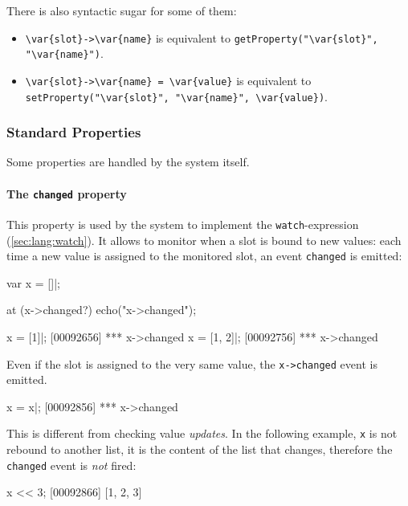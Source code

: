 There is also syntactic sugar for some of them:

\begin{itemize}
\item \lstinline|\var{slot}->\var{name}| is equivalent to
  \lstinline[style=varInString]|getProperty("\var{slot}", "\var{name}")|.
\item \lstinline|\var{slot}->\var{name} = \var{value}| is equivalent to
  \lstinline[style=varInString]|setProperty("\var{slot}", "\var{name}", \var{value})|.
\end{itemize}

\subsubsection{Standard Properties}
\label{sec:lang:prop:std}

Some properties are handled by the system itself.


\paragraph{The \lstinline|changed| property}

This property is used by the system to implement the
\lstinline|watch|-expression (\autoref{sec:lang:watch}).  It allows to
monitor when a slot is bound to new values: each time a new value is
assigned to the monitored slot, an event \lstinline|changed| is emitted:

\begin{urbiscript}[firstnumber=1]
var x = []|;

at (x->changed?)
  echo("x->changed");

x = [1]|;
[00092656] *** x->changed
x = [1, 2]|;
[00092756] *** x->changed
\end{urbiscript}

Even if the slot is assigned to the very same value, the
\lstinline|x->changed| event is emitted.

\begin{urbiscript}
x = x|;
[00092856] *** x->changed
\end{urbiscript}

This is different from checking value \emph{updates}.  In the following
example, \lstinline|x| is not rebound to another list, it is the content of
the list that changes, therefore the \lstinline|changed| event is \emph{not}
fired:

\begin{urbiscript}
x << 3;
[00092866] [1, 2, 3]
\end{urbiscript}

